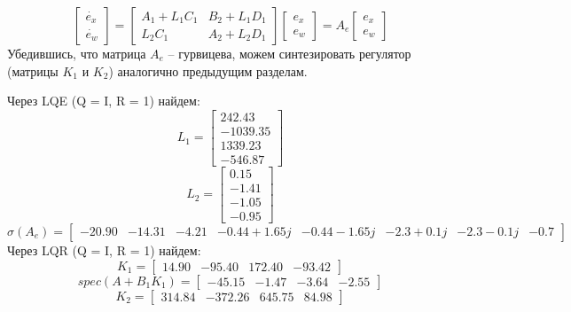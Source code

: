 \[
    \begin{bmatrix}
        \dot{e_x} \\
        \dot{e_w}
    \end{bmatrix} = 
    \begin{bmatrix}
        A_1 + L_1C_1 & B_2 + L_1D_1 \\
        L_2C_1 & A_2 + L_2D_1
    \end{bmatrix}
    \begin{bmatrix}
        e_x \\
        e_w
    \end{bmatrix} = A_e 
    \begin{bmatrix}
        e_x \\
        e_w
    \end{bmatrix}
\] 
Убедившись, что матрица \(A_e\) -- гурвицева, можем синтезировать регулятор (матрицы $K_1$ и $K_2$) аналогично предыдущим разделам.

Через LQE (Q = I, R = 1) найдем:
\[L_1 = \begin{bmatrix}
    242.43\\
   -1039.35\\
    1339.23\\
   -546.87
  \end{bmatrix}\]
  \[L_2 = \begin{bmatrix}
    0.15\\
   -1.41\\
   -1.05\\
   -0.95
  \end{bmatrix}\]
  \[\sigma (A_e) = \begin{bmatrix}
   -20.90 & -14.31 & -4.21 & -0.44 + 1.65j & -0.44 -1.65j & -2.3 + 0.1j & -2.3 -0.1j & -0.7
  \end{bmatrix}\]
Через LQR  (Q = I, R = 1) найдем:
\[K_1 = \begin{bmatrix}
    14.90 & -95.40 &  172.40 & -93.42
  \end{bmatrix}\]
  \[spec(A + B_1 K_1) = \begin{bmatrix}
   -45.15 & -1.47 & -3.64 & -2.55
  \end{bmatrix}\]
  \[K_2 = \begin{bmatrix}
    314.84 & -372.26 &  645.75 &  84.98
  \end{bmatrix}\]

